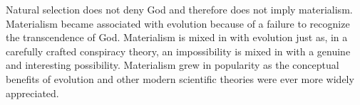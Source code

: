 \documentclass[twocolumn]{article}
\begin{document}
Natural selection does not deny God and therefore does not imply materialism.
Materialism became associated with evolution because of a failure to recognize
the transcendence of God. Materialism is mixed in with evolution just as, in a
carefully crafted conspiracy theory, an impossibility is mixed in with a
genuine and interesting possibility.  Materialism grew in popularity as the
conceptual benefits of evolution and other modern scientific theories were ever
more widely appreciated.
\end{document}
